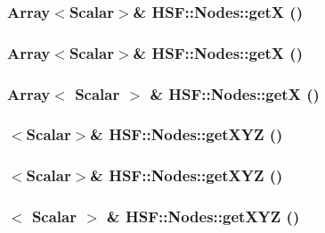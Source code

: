 \label{classHSF_1_1Nodes_ac040e3ba37f121943eb2d90c785addce}
\hypertarget{classHSF_1_1Nodes_a7bd1a1a78aab473faef1ebacacf9f731}{
\subsubsection[{getX}]{\setlength{\rightskip}{0pt plus 5cm}Array$<${\bf Scalar}$>$\& HSF::Nodes::getX ()}}
\label{classHSF_1_1Nodes_a7bd1a1a78aab473faef1ebacacf9f731}
\hypertarget{classHSF_1_1Nodes_a7bd1a1a78aab473faef1ebacacf9f731}{
\subsubsection[{getX}]{\setlength{\rightskip}{0pt plus 5cm}Array$<${\bf Scalar}$>$\& HSF::Nodes::getX ()}}
\label{classHSF_1_1Nodes_a7bd1a1a78aab473faef1ebacacf9f731}
\hypertarget{classHSF_1_1Nodes_a4182f41b3eac0fe1654a9e857fb2ea76}{
\subsubsection[{getX}]{\setlength{\rightskip}{0pt plus 5cm}Array$<$ {\bf Scalar} $>$ \& HSF::Nodes::getX ()}}
\label{classHSF_1_1Nodes_a4182f41b3eac0fe1654a9e857fb2ea76}
\hypertarget{classHSF_1_1Nodes_a11ee5739c1d94dd00efb39f461a257ff}{
\subsubsection[{getXYZ}]{$<${\bf Scalar}$>$\& HSF::Nodes::getXYZ ()}}
\label{classHSF_1_1Nodes_a11ee5739c1d94dd00efb39f461a257ff}
\hypertarget{classHSF_1_1Nodes_a11ee5739c1d94dd00efb39f461a257ff}{
\subsubsection[{getXYZ}]{$<${\bf Scalar}$>$\& HSF::Nodes::getXYZ ()}}
\label{classHSF_1_1Nodes_a11ee5739c1d94dd00efb39f461a257ff}
\hypertarget{classHSF_1_1Nodes_a760ecb9be7c2a92d622bfce425201784}{
\subsubsection[{getXYZ}]{$<$ {\bf Scalar} $>$ \& HSF::Nodes::getXYZ ()}}
